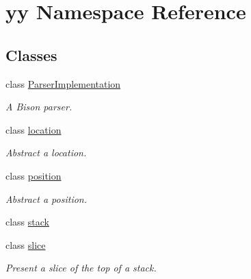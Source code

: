 \hypertarget{namespaceyy}{
\section{yy Namespace Reference}
\label{namespaceyy}
}
\subsection*{Classes}
\begin{DoxyCompactItemize}
\item 
class \hyperlink{classyy_1_1_parser_implementation}{ParserImplementation}
\begin{DoxyCompactList}\small\item\em A Bison parser. \end{DoxyCompactList}\item 
class \hyperlink{classyy_1_1location}{location}
\begin{DoxyCompactList}\small\item\em Abstract a location. \end{DoxyCompactList}\item 
class \hyperlink{classyy_1_1position}{position}
\begin{DoxyCompactList}\small\item\em Abstract a position. \end{DoxyCompactList}\item 
class \hyperlink{classyy_1_1stack}{stack}
\item 
class \hyperlink{classyy_1_1slice}{slice}
\begin{DoxyCompactList}\small\item\em Present a slice of the top of a stack. \end{DoxyCompactList}\end{DoxyCompactItemize}

